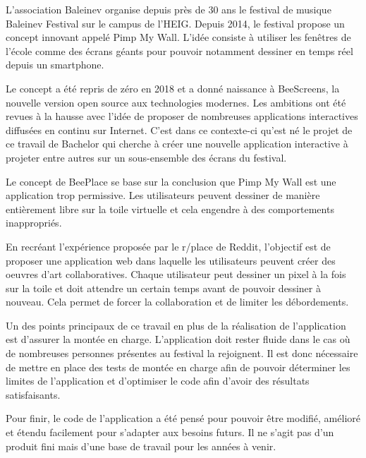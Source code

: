 L'association Baleinev organise depuis près de 30 ans le festival de musique Baleinev Festival sur le campus de l'HEIG.
Depuis 2014, le festival propose un concept innovant appelé Pimp My Wall. L'idée consiste à utiliser les fenêtres de l'école comme des écrans géants pour pouvoir notamment dessiner en temps réel depuis un smartphone.

Le concept a été repris de zéro en 2018 et a donné naissance à BeeScreens, la nouvelle version open source aux technologies modernes. Les ambitions ont été revues à la hausse avec l'idée de proposer de nombreuses applications interactives diffusées en continu sur Internet.
C'est dans ce contexte-ci qu'est né le projet de ce travail de Bachelor qui cherche à créer une
nouvelle application interactive à projeter entre autres sur un sous-ensemble des écrans du festival.

\asterism

Le concept de BeePlace se base sur la conclusion que Pimp My Wall est une application trop permissive. Les utilisateurs peuvent dessiner de manière entièrement libre sur la toile virtuelle et cela engendre à des comportements inappropriés.

En recréant l'expérience proposée par le r/place de Reddit, l'objectif est de proposer une application web dans laquelle les utilisateurs peuvent créer des oeuvres d'art collaboratives. Chaque utilisateur peut dessiner un pixel à la fois sur la toile et doit attendre un certain temps avant de pouvoir dessiner à nouveau. Cela permet de forcer la collaboration et de limiter les débordements.

Un des points principaux de ce travail en plus de la réalisation de l'application est d'assurer la montée en charge. L'application doit rester fluide dans le cas où de nombreuses personnes présentes au festival la rejoignent. Il est donc nécessaire de mettre en place des tests de montée en charge afin de pouvoir déterminer les limites de l'application et d'optimiser le code afin d'avoir des résultats satisfaisants.

Pour finir, le code de l'application a été pensé pour pouvoir être modifié, amélioré et étendu facilement pour s'adapter aux besoins futurs. Il ne s'agit pas d'un produit fini mais d'une base de travail pour les années à venir.
